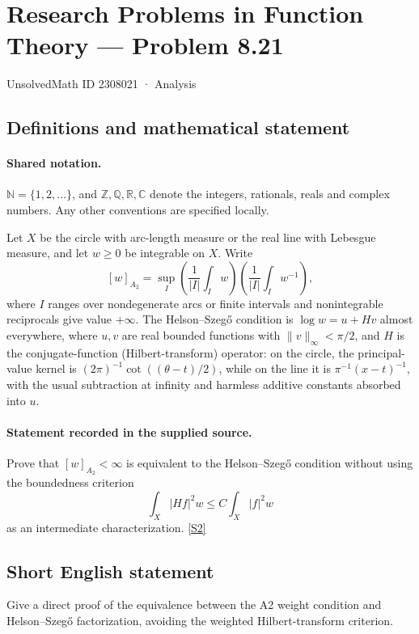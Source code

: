 \documentclass[11pt]{book}
\newcommand{\sref}[2]{\hyperlink{source:#1:#2}{[S#2]}}
\begin{document}
\setcounter{section}{2308020}
\section{Research Problems in Function Theory — Problem 8.21}\label{2308021}
{\small\sffamily UnsolvedMath ID 2308021 · Analysis}
\subsection{Definitions and mathematical statement}

\paragraph{Shared notation.}$\mathbb N=\{1,2,\ldots\}$, and $\mathbb Z,\mathbb Q,\mathbb R,\mathbb C$ denote the integers, rationals, reals and complex numbers. Any other conventions are specified locally.


Let $X$ be the circle with arc-length measure or the real line with Lebesgue measure, and let $w\ge0$ be integrable on $X$. Write \[[w]_{A_2}=\sup_I\left(\frac1{|I|}\int_Iw\right)\left(\frac1{|I|}\int_Iw^{-1}\right),\] where $I$ ranges over nondegenerate arcs or finite intervals and nonintegrable reciprocals give value $+\infty$. The Helson--Szeg\H{o} condition is $\log w=u+Hv$ almost everywhere, where $u,v$ are real bounded functions with $\|v\|_\infty<\pi/2$, and $H$ is the conjugate-function (Hilbert-transform) operator: on the circle, the principal-value kernel is $(2\pi)^{-1}\cot((\theta-t)/2)$, while on the line it is $\pi^{-1}(x-t)^{-1}$, with the usual subtraction at infinity and harmless additive constants absorbed into $u$.
\paragraph{Statement recorded in the supplied source.}
Prove that $[w]_{A_2}<\infty$ is equivalent to the Helson--Szeg\H{o} condition without using the boundedness criterion \[\int_X|Hf|^2w\le C\int_X|f|^2w\] as an intermediate characterization. \sref{2308021}{2}
\subsection{Short English statement}
Give a direct proof of the equivalence between the A2 weight condition and Helson–Szegő factorization, avoiding the weighted Hilbert-transform criterion.
\end{document}
